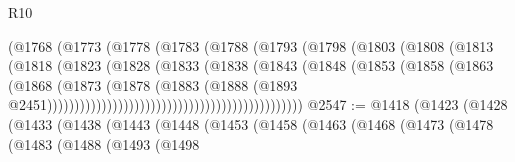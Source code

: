 \begin{lexlean}{R10}
\begin{coremodule}
{{{{{{{{{{{{{{{{{{{{{{{{{{{{{{{{{{{{{{{{{{{{{{{{{{{{{{{{{{{{{{{{{{{{{{{{{{{{{{{{{{{{{{{{{{{{{{{{{{{{{{{{{{{{                                              (@1768
                                                (@1773
                                                  (@1778
                                                    (@1783
                                                      (@1788
                                                        (@1793
                                                          (@1798
                                                            (@1803
                                                              (@1808
                                                                (@1813
                                                                  (@1818
                                                                    (@1823
                                                                      (@1828
                                                                        (@1833
                                                                          (@1838
                                                                            (@1843
                                                                              (@1848
                                                                                (@1853
                                                                                  (@1858
                                                                                    (@1863
                                                                                      (@1868
                                                                                        (@1873
                                                                                          (@1878
                                                                                            (@1883
                                                                                              (@1888
                                                                                                (@1893
                                                                                                  @2451)))))))))))))))))))))))))))))))))))))))))))))))
@2547 := @1418
    (@1423
      (@1428
        (@1433
          (@1438
            (@1443
              (@1448
                (@1453
                  (@1458
                    (@1463
                      (@1468
                        (@1473
                          (@1478
                            (@1483
                              (@1488
                                (@1493
                                  (@1498
}}}}}}}}}}}}}}}}}}}}}}}}}}}}}}}}}}}}}}}}}}}}}}}}}}}}}}}}}}}}}}}}}}}}}}}}}}}}}}}}}}}}}}}}}}}}}}}}}}}}}}}}}}}}
\end{coremodule}
\end{lexlean}
